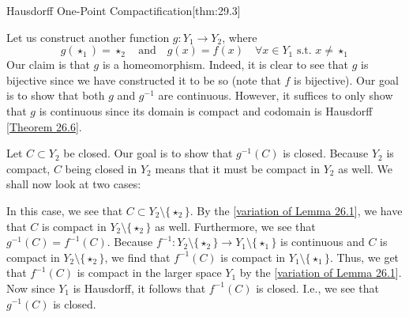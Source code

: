 \begin{thmBox}{Hausdorff One-Point Compactification}[thm:29.3]
\begin{proofBox}
        Let us construct another function \( g: Y_{ 1 } \rightarrow Y_{ 2 } \),
        where
        \begin{equation*}
            g ( \star_{ 1 } ) = \star_{ 2 }
            \quad \mathrm{and} \quad 
            g ( x ) = f ( x )
            \quad 
            \forall x \in Y_{ 1 } \text{ s.t. } x \neq \star_{ 1 }
        \end{equation*} 
        Our claim is that \( g \) is a homeomorphism.
        Indeed, it is clear to see that \( g \) is bijective since we have 
        constructed it to be so (note that \( f \) is bijective).
        Our goal is to show that both \( g \) and \( g^{ -1 } \) are continuous.
        However, it suffices to only show that \( g \) is continuous since
        its domain is compact and codomain is Hausdorff
        [\hyperlink{thm:26.6}{Theorem 26.6}].
        
        \baseSkip

        Let \( C \subset Y_{ 2 } \) be closed.
        Our goal is to show that \( g^{ -1 } ( C ) \) is closed.
        Because \( Y_{ 2 } \) is compact, \( C \) being closed in \( Y_{ 2 } \) means 
        that it must be compact in \( Y_{ 2 } \) as well.
        We shall now look at two cases:

        \baseSkip

        In this case, we see that \( C \subset Y_{ 2 } \setminus \{ \star_{ 2 } \} \).
        By the [\hyperlink{thm:26.1}{variation of Lemma 26.1}], we have that \( C \) is 
        compact in \( Y_{ 2 } \setminus \{ \star_{ 2 } \} \) as well.
        Furthermore, we see that \( g^{ -1 } ( C ) = f^{ -1 } ( C ) \).
        Because 
        \( 
            f^{ -1 }: 
            Y_{ 2 } \setminus \{ \star_{ 2 } \} 
            \rightarrow 
            Y_{ 1 } \setminus \{ \star_{ 1 } \} 
        \) 
        is continuous and \( C \) is compact in 
        \( Y_{ 2 } \setminus \{ \star_{ 2 } \} \), we find that \( f^{ -1 } ( C ) \) is 
        compact in \( Y_{ 1 } \setminus \{ \star_{ 1 } \} \).
        Thus, we get that \( f^{ -1 } ( C ) \) is compact in the larger 
        space \( Y_{ 1 } \) by the [\hyperlink{thm:26.1}{variation of Lemma 26.1}].
        Now since \( Y_{ 1 } \) is Hausdorff, it follows that \( f^{ -1 } ( C ) \) 
        is closed.
        I.e., we see that \( g^{ -1 } ( C ) \) is closed.

        \baseSkip


\end{proofBox}
\end{thmBox}
